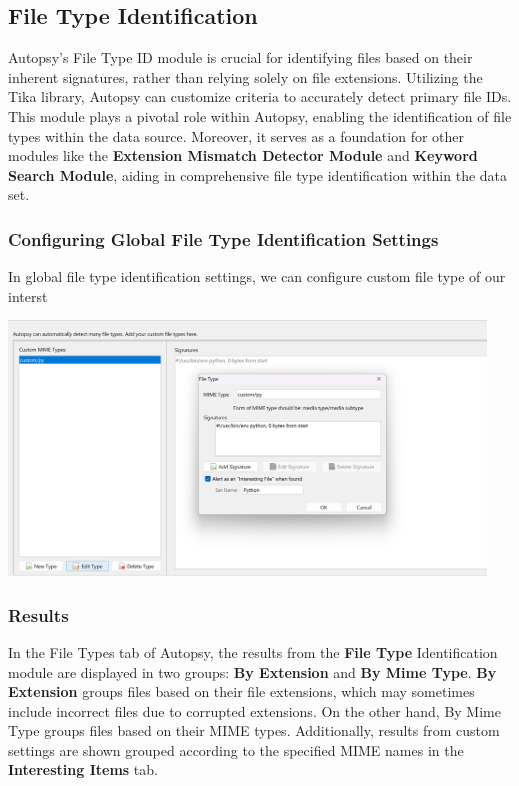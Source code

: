 \documentclass{article}
\begin{document}
\subsection{File Type Identification}

Autopsy's File Type ID module is crucial for identifying files based on their inherent signatures, rather than relying solely on file extensions. Utilizing the Tika library, Autopsy can customize criteria to accurately detect primary file IDs. This module plays a pivotal role within Autopsy, enabling the identification of file types within the data source. Moreover, it serves as a foundation for other modules like the \textbf{Extension Mismatch Detector Module} and \textbf{Keyword Search Module}, aiding in comprehensive file type identification within the data set.

\subsubsection*{Configuring Global File Type Identification Settings}
In global file type identification settings, we can configure custom file type of our interst

\begin{center}
    \includegraphics[width=0.95\textwidth]{3/3.3/File Type Identification Settings.png}
\end{center}

\subsubsection*{Results}
In the File Types tab of Autopsy, the results from the \textbf{File Type} Identification module are displayed in two groups: \textbf{By Extension} and \textbf{By Mime Type}. \textbf{By Extension} groups files based on their file extensions, which may sometimes include incorrect files due to corrupted extensions. On the other hand, By Mime Type groups files based on their MIME types. Additionally, results from custom settings are shown grouped according to the specified MIME names in the \textbf{Interesting Items} tab.
\end{document}
